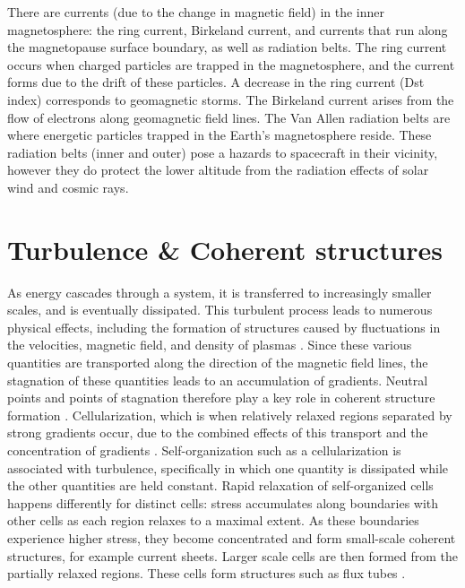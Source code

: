 There are currents (due to the change in magnetic field) in the inner magnetosphere: the ring current, Birkeland current, and currents that run along the magnetopause surface boundary, as well as radiation belts. The ring current occurs when charged particles are trapped in the magnetosphere, and the current forms due to the drift of these particles. A decrease in the ring current (Dst index) corresponds to geomagnetic storms. The Birkeland current arises from the flow of electrons along geomagnetic field lines. The Van Allen radiation belts are where energetic particles trapped in the Earth's magnetosphere reside. These radiation belts (inner and outer) pose a hazards to spacecraft in their vicinity, however they do protect the lower altitude from the radiation effects of solar wind and cosmic rays.


\section{Turbulence \& Coherent structures}
As energy cascades through a system, it is transferred to increasingly smaller scales, and is eventually dissipated. This turbulent process leads to numerous physical effects, including the formation of structures caused by fluctuations in the velocities, magnetic field, and density of plasmas \citep{Matthaeus:2015}. Since these various quantities are transported along the direction of the magnetic field lines, the stagnation of these quantities leads to an accumulation of gradients. Neutral points and points of stagnation therefore play a key role in coherent structure formation \citep{Matthaeus:2015}. Cellularization, which is when relatively relaxed regions separated by strong gradients occur, due to the combined effects of this transport and the concentration of gradients \citep{Matthaeus:2015}. Self-organization such as a cellularization is associated with turbulence, specifically in which one quantity is dissipated while the other quantities are held constant. Rapid relaxation of self-organized cells happens differently for distinct cells: stress accumulates along boundaries with other cells as each region relaxes to a maximal extent. As these boundaries experience higher stress, they become concentrated and form small-scale coherent structures, for example current sheets. Larger scale cells are then formed from the partially relaxed regions. These cells form structures such as flux tubes \citep{Matthaeus:2015}.


